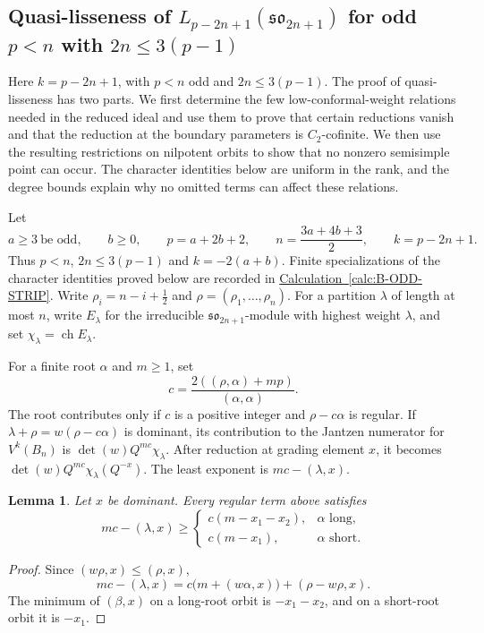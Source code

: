 \documentclass[11pt,a4paper]{amsart}
\numberwithin{equation}{section}
\newtheorem{lemma}[theorem]{Lemma}
\theoremstyle{definition}
\theoremstyle{remark}
\newcommand{\sog}{\mathfrak{so}}
\begin{document}
\subsection{\texorpdfstring{Quasi-lisseness of $L_{p-2n+1}(\sog_{2n+1})$ for odd $p<n$ with $2n\le3(p-1)$}{Quasi-lisseness of L(p-2n+1)(so(2n+1)) for odd p below n with 2n at most 3(p-1)}}\label{B:lower-integral}
\label{B:uniform-odd-sums}

Here $k=p-2n+1$, with $p<n$ odd and $2n\le3(p-1)$.
The proof of quasi-lisseness has two parts. We first determine the few
low-conformal-weight relations needed in the reduced ideal and use
them to prove that certain reductions vanish and that the reduction
at the boundary parameters is $C_2$-cofinite. We then use the resulting
restrictions on nilpotent orbits to show that no nonzero semisimple point can occur. The character
identities below are uniform in the rank, and the degree bounds explain
why no omitted terms can affect these relations.

Let
$$
 a\geq3\ \text{be odd},\qquad b\geq0,\qquad
 p=a+2b+2,\qquad n=\frac{3a+4b+3}{2},\qquad k=p-2n+1.
$$
Thus $p<n$, $2n\leq3(p-1)$ and $k=-2(a+b)$.
Finite specializations of the character identities proved below are recorded in
\hyperref[calc:B-ODD-STRIP]{Calculation~\ref*{calc:B-ODD-STRIP}}.
Write $\rho_i=n-i+\tfrac12$ and $\rho=(\rho_1,\ldots,\rho_n)$.
For a partition $\lambda$ of length at most $n$, write $E_\lambda$
for the irreducible $\mathfrak{so}_{2n+1}$-module with highest weight
$\lambda$, and set $\chi_\lambda=\operatorname{ch}E_\lambda$.

For a finite root $\alpha$ and $m\geq1$, set
$$
 c=\frac{2((\rho,\alpha)+mp)}{(\alpha,\alpha)}.
$$
The root contributes only if $c$ is a positive integer and
$\rho-c\alpha$ is regular. If
$\lambda+\rho=w(\rho-c\alpha)$ is dominant, its contribution to the
Jantzen numerator for $V^k(B_n)$ is
$\det(w)Q^{mc}\chi_\lambda$. After reduction at grading element $x$,
it becomes $\det(w)Q^{mc}\chi_\lambda(Q^{-x})$.
The least exponent is $mc-(\lambda,x)$.

\begin{lemma}\label{B:uniform-mode-bound}
Let $x$ be dominant. Every regular term above satisfies
$$
 mc-(\lambda,x)\geq
 \begin{cases}
 c(m-x_1-x_2),&\alpha\text{ long},\\
 c(m-x_1),&\alpha\text{ short}.
 \end{cases}
$$
\end{lemma}
\begin{proof}
Since $(w\rho,x)\leq(\rho,x)$,
$$
 mc-(\lambda,x)
 =c\bigl(m+(w\alpha,x)\bigr)+(\rho-w\rho,x).
$$
The minimum of $(\beta,x)$ on a long-root orbit is $-x_1-x_2$, and
on a short-root orbit it is $-x_1$.
\end{proof}
\end{document}
